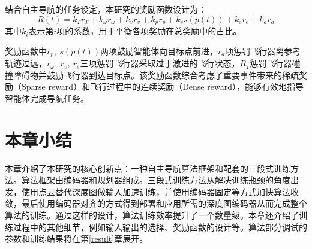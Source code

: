 结合自主导航的任务设定，本研究的奖励函数设计为：
\[
  R(t) = k_Tr_T + k_\omega r_\omega + k_v r_v+ k_p r_p + k_s s(p(t))+ k_e r_e + k_a r_a
\]
其中$k_i$表示第$i$项的系数，用于平衡各项奖励在总奖励中的占比。

奖励函数中$r_p,\ s(p(t))$两项鼓励智能体向目标点前进，$r_a$项惩罚飞行器离参考轨迹过远，$r_\omega,\ r_v,\ r_e$三项惩罚飞行器采取过于激进的飞行状态，$R_T$惩罚飞行器碰撞障碍物并鼓励飞行器到达目标点。该奖励函数综合考虑了重要事件带来的稀疏奖励（Sparse reward）和飞行过程中的连续奖励（Dense reward），能够有效地指导智能体完成导航任务。

\section{本章小结}

本章介绍了本研究的核心创新点：一种自主导航算法框架和配套的三段式训练方法。算法框架由编码器和规划器组成。三段式训练方法从解决训练瓶颈的角度出发，使用点云替代深度图做输入加速训练，并使用编码器固定等方式加快算法收敛，最后使用编码器对齐的方式得到部署和应用所需的深度图编码器从而完成整个算法的训练。通过这样的设计，算法训练效率提升了一个数量级。本章还介绍了训练过程中的其他细节，例如输入输出的选择、奖励函数的设计等。算法部分调试的参数和训练结果将在第\ref{result}章展开。


